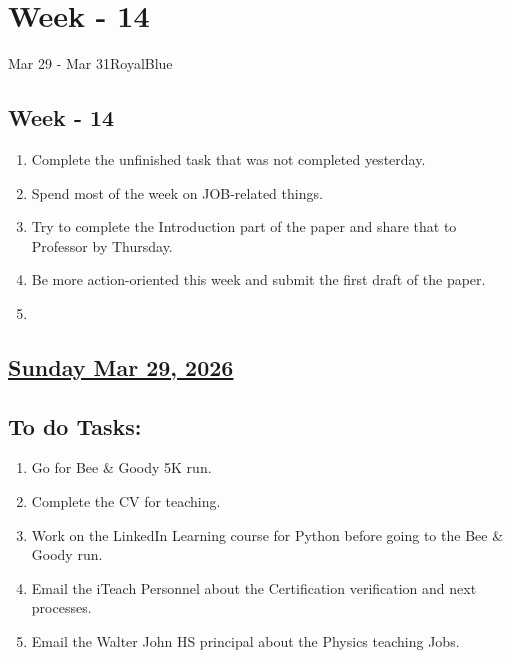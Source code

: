 \section{Week - 14}
\begin{physicsmodule}{Mar 29 - Mar 31}{RoyalBlue}
  \begin{lawbox}
    \subsection*{ Week - 14}
    \begin{enumerate}
    \item Complete the unfinished task that was not completed yesterday.
    \item Spend most of the week on JOB-related things.
    \item Try to complete the Introduction part of the paper and share that to Professor by Thursday.
    \item Be more action-oriented this week and submit the first draft of the paper. 
    \item 
\end{enumerate}
  \end{lawbox}
\end{physicsmodule}
\subsection*{\underline{Sunday Mar 29, 2026}}
\subsection*{To do Tasks:}
\begin{enumerate}
    \item Go for Bee \& Goody 5K run. \cmark
    \item Complete the CV for teaching. \cmark
    \item Work on the LinkedIn Learning course for Python before going to the Bee \& Goody run. \xmark
    \item Email the iTeach Personnel about the Certification verification and next processes. \cmark
    \item Email the Walter John HS principal about the Physics teaching Jobs. \xmark
\end{enumerate}

